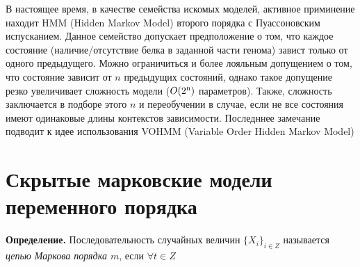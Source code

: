 \documentclass[10pt,a4paper]{article}
\begin{document}
В настоящее время, в качестве семейства искомых моделей, активное приминение находит HMM (Hidden Markov Model)\cite{Rabiner1989} второго порядка с Пуассоновским испусканием.
Данное семейство допускает предположение о том, что каждое состояние (наличие/отсутствие белка в заданной части генома) завист только от одного предыдущего.
Можно ограничиться и более лояльным допущением о том, что состояние зависит от $n$ предыдущих состояний, однако такое допущение резко увеличивает сложность модели ($O(2\textsuperscript{n})$ параметров). Также, сложность заключается в подборе этого $n$ и переобучении в случае, если не все состояния имеют одинаковые длины контекстов зависимости.
Последннее замечание подводит к идее использования VOHMM (Variable Order Hidden Markov Model)\cite{Wang2006}


\section{Скрытые марковские модели переменного порядка}

\textbf{Определение.} Последовательность случайных величин $ \{X_{i}\}_{i \in Z}$ называется \emph{цепью Маркова порядка $ m $}, если $ \forall t\in Z $
\end{document}
